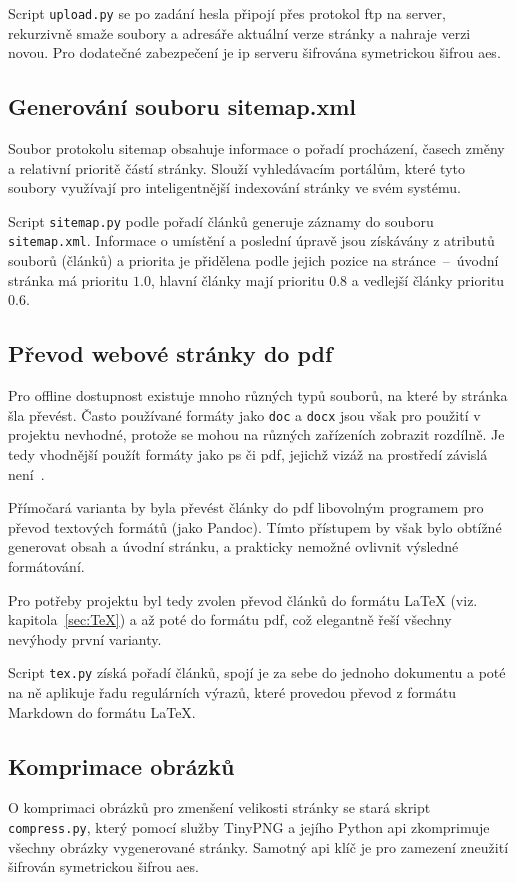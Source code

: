 \documentclass[a4paper, 12pt]{article}
\newcommand*{\fullref}[1]{\hyperref[{#1}]{\ref*{#1}}}
\begin{document}
  Script \texttt{upload.py} se po zadání hesla připojí přes protokol \gls{ftp} na server, rekurzivně smaže soubory a adresáře aktuální verze stránky a nahraje verzi novou. Pro dodatečné zabezpečení je \gls{ip} serveru šifrována symetrickou šifrou \gls{aes}.


  \subsection{Generování souboru sitemap.xml}
  Soubor protokolu sitemap obsahuje informace o pořadí procházení, časech změny a relativní prioritě částí stránky. Slouží vyhledávacím portálům, které tyto soubory využívají pro inteligentnější indexování stránky ve svém systému.

  Script \texttt{sitemap.py} podle pořadí článků generuje záznamy do souboru \texttt{sitemap.xml}. Informace o umístění a poslední úpravě jsou získávány z atributů souborů (článků) a priorita je přidělena podle jejich pozice na stránce~--~úvodní stránka má prioritu $1.0$, hlavní články mají prioritu $0.8$ a vedlejší články prioritu $0.6$.


  \subsection{Převod webové stránky do \acrshort{pdf}} \label{sec:Převod webové stránky do PDF}
  Pro offline dostupnost existuje mnoho různých typů souborů, na které by stránka šla převést. Často používané formáty jako \texttt{doc} a \texttt{docx} jsou však pro použití v projektu nevhodné, protože se mohou na různých zařízeních zobrazit rozdílně. Je tedy vhodnější použít formáty jako \gls{ps} či \gls{pdf}, jejichž vizáž na prostředí závislá není~\cite{history-of-pdf}.

  Přímočará varianta by byla převést články do \gls{pdf} libovolným programem pro převod textových formátů (jako Pandoc). Tímto přístupem by však bylo obtížné generovat obsah a úvodní stránku, a prakticky nemožné ovlivnit výsledné formátování.

  Pro potřeby projektu byl tedy zvolen převod článků do formátu \LaTeX{} (viz. kapitola~\fullref{sec:TeX}) a až poté do formátu \gls{pdf}, což elegantně řeší všechny nevýhody první varianty.

  Script \texttt{tex.py} získá pořadí článků, spojí je za sebe do jednoho dokumentu a poté na ně aplikuje řadu regulárních výrazů, které provedou převod z formátu Markdown do formátu \LaTeX.


  \subsection{Komprimace obrázků}
  O komprimaci obrázků pro zmenšení velikosti stránky se stará skript \texttt{compress.py}, který pomocí služby TinyPNG a jejího Python \gls{api} zkomprimuje všechny obrázky vygenerované stránky. Samotný \gls{api} klíč je pro zamezení zneužití šifrován symetrickou šifrou \gls{aes}.
\end{document}
